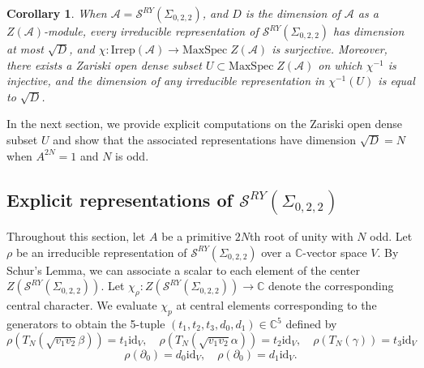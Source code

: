 \documentclass{article}
\newcommand{\del}{\partial}
\newcommand{\C}{\mathbb{C}}
\newcommand{\id}{\text{id}}
\renewcommand{\S}{\mathcal{S}}
\newcommand{\SRY}{\mathcal{S}^{RY}}
\newcommand{\san}{\Sigma_{0,2,2}}
\newtheorem{corollary}[theorem]{Corollary}
\theoremstyle{definition}
\renewcommand{\san}{\Sigma_{0, 2, 2}}
\renewcommand{\SRY}{\ensuremath{ \mathcal S^{RY}}}
\begin{document}
\begin{corollary} 
When $\mathcal{A} = \mathcal S^{RY}(\san)$, and $D$ is the dimension of  $\mathcal{A}$ as a $Z(\mathcal{A})$-module,  every irreducible representation of  $\mathcal S^{RY}(\san)$ has dimension at most $\sqrt{D}$, and   $\chi: \mathrm{Irrep}(\mathcal{A})  \to  \mathrm{MaxSpec}\; Z(\mathcal{A})$ is surjective.  Moreover, there exists a Zariski  open dense subset $U \subset \mathrm{MaxSpec}\; Z(\mathcal{A})$ on which  $\chi^{-1}$ is injective, and the dimension of any irreducible representation in $\chi^{-1}(U)$ is equal to  $\sqrt{D}$. 
\end{corollary} 



In the next section, we provide explicit computations on the Zariski open dense subset $U$ and show that the associated representations have dimension $\sqrt{D} = N$ when $A^{2N}=1$ and $N$ is odd.  


\subsection{Explicit representations of $\S^{RY}(\Sigma_{0,2,2})$}


Throughout this section, let $A$ be a primitive $2N$th root of unity with $N$ odd. Let $\rho$ be an irreducible representation of $\SRY(\san)$ over a $\C$-vector space $V$. By Schur's Lemma, we can associate a scalar to each element of the center $Z(\SRY(\san) )$. Let $\chi_\rho: Z(\SRY(\san) ) \to \C$ denote the corresponding central character.  We evaluate $\chi_p$ at central elements corresponding to the generators to obtain the 5-tuple  $(t_1, t_2, t_3, d_0, d_1) \in \C^5$ defined by  
\[
    \rho \left(T_N(\sqrt{v_1v_2}\beta) \right) =t_1\id_V, \quad  
    \rho \left(T_N(\sqrt{v_1v_2}\alpha) \right) =t_2\id_V, \quad  
    \rho \left(T_N(\gamma)\right)=t_3\id_V
   \]
    \[
    \rho(\del_0) = d_0\id_V,\quad
    \rho(\del_0) = d_1\id_V. 
\]
\end{document}
